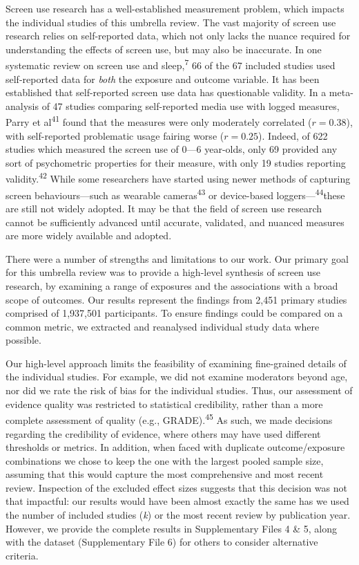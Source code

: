 \documentclass[
  english,
  man]{apa6}
\begin{document}
Screen use research has a well-established measurement problem, which impacts the individual studies of this umbrella review.
The vast majority of screen use research relies on self-reported data, which not only lacks the nuance required for understanding the effects of screen use, but may also be inaccurate.
In one systematic review on screen use and sleep,\textsuperscript{7} 66 of the 67 included studies used self-reported data for \emph{both} the exposure and outcome variable.
It has been established that self-reported screen use data has questionable validity.
In a meta-analysis of 47 studies comparing self-reported media use with logged measures, Parry et al\textsuperscript{41} found that the measures were only moderately correlated (\(r = 0.38\)), with self-reported problematic usage fairing worse (\(r = 0.25\)).
Indeed, of 622 studies which measured the screen use of 0---6 year-olds, only 69 provided any sort of psychometric properties for their measure, with only 19 studies reporting validity.\textsuperscript{42}
While some researchers have started using newer methods of capturing screen behaviours---such as wearable cameras\textsuperscript{43} or device-based loggers---\textsuperscript{44}these are still not widely adopted.
It may be that the field of screen use research cannot be sufficiently advanced until accurate, validated, and nuanced measures are more widely available and adopted.

There were a number of strengths and limitations to our work.
Our primary goal for this umbrella review was to provide a high-level synthesis of screen use research, by examining a range of exposures and the associations with a broad scope of outcomes.
Our results represent the findings from 2,451 primary studies comprised of 1,937,501 participants.
To ensure findings could be compared on a common metric, we extracted and reanalysed individual study data where possible.

Our high-level approach limits the feasibility of examining fine-grained details of the individual studies.
For example, we did not examine moderators beyond age, nor did we rate the risk of bias for the individual studies.
Thus, our assessment of evidence quality was restricted to statistical credibility, rather than a more complete assessment of quality (e.g., GRADE).\textsuperscript{45}
As such, we made decisions regarding the credibility of evidence, where others may have used different thresholds or metrics.
In addition, when faced with duplicate outcome/exposure combinations we chose to keep the one with the largest pooled sample size, assuming that this would capture the most comprehensive and most recent review.
Inspection of the excluded effect sizes suggests that this decision was not that impactful: our results would have been almost exactly the same has we used the number of included studies (\emph{k}) or the most recent review by publication year.
However, we provide the complete results in Supplementary Files 4 \& 5, along with the dataset (Supplementary File 6) for others to consider alternative criteria.
\end{document}

